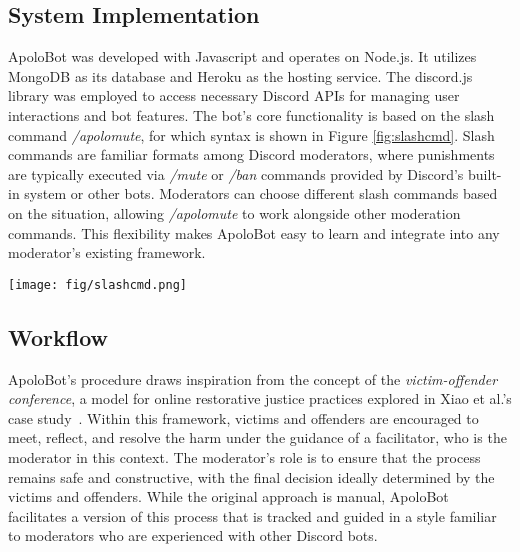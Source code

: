 \subsection{System Implementation} \label{system} 
ApoloBot was developed with Javascript and operates on Node.js. It utilizes MongoDB as its database and Heroku as the hosting service. The discord.js library was employed to access necessary Discord APIs for managing user interactions and bot features. The bot’s core functionality is based on the slash command \textit{/apolomute}, for which syntax is shown in Figure \ref{fig:slashcmd}. Slash commands are familiar formats among Discord moderators, where punishments are typically executed via \textit{/mute} or \textit{/ban} commands provided by Discord's built-in system or other bots. Moderators can choose different slash commands based on the situation, allowing \textit{/apolomute} to work alongside other moderation commands. This flexibility makes ApoloBot easy to learn and integrate into any moderator's existing framework.

\begin{figure*}[h!]
  \centering
  \texttt{[image: fig/slashcmd.png]}
  \caption{The slash command \textit{/apolomute} that is used in the primary workflow. The first four input fields are required, where the moderator specifies the involved offender and victim, along with mute duration and reason. Optionally, proof can be attached as an image, and moderator can choose to first review the victim's apology request by setting `review-request' to True.}
  \label{fig:slashcmd}
\end{figure*}

\subsection{Workflow} 
ApoloBot's procedure draws inspiration from the concept of the \textit{victim-offender conference}, a model for online restorative justice practices explored in Xiao et al.’s case study~\cite{Xiao2023}. Within this framework, victims and offenders are encouraged to meet, reflect, and resolve the harm under the guidance of a facilitator, who is the moderator in this context. The moderator's role is to ensure that the process remains safe and constructive, with the final decision ideally determined by the victims and offenders. While the original approach is manual, ApoloBot facilitates a version of this process that is tracked and guided in a style familiar to moderators who are experienced with other Discord bots. 

